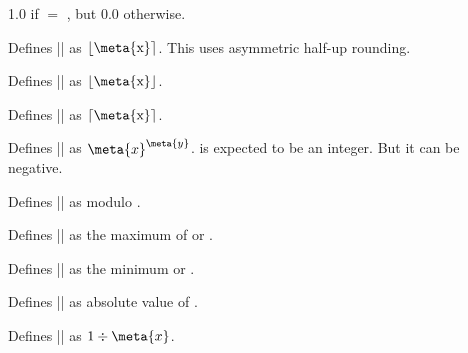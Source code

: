 \begin{command}{\pgfmathequalto{}}       
	1.0 if  $=$ , but 0.0 otherwise.                    
\end{command}

\begin{command}{\pgfmathround{}}              
	Defines |\pgfmathresult| as $\left\lfloor\textrm{\meta{x}}\right\rceil$.	
	This uses asymmetric	half-up rounding.                          
\end{command}

\begin{command}{\pgfmathfloor{}}              
	Defines |\pgfmathresult| as $\left\lfloor\textrm{\meta{x}}\right\rfloor$.
\end{command}

\begin{command}{\pgfmathceil{}}               
	Defines |\pgfmathresult| as $\left\lceil\textrm{\meta{x}}\right\rceil$.                           
\end{command}
	
\begin{command}{\pgfmathpower{}}         
	Defines |\pgfmathresult| as $\meta{x}^{\meta{y}}$.  is 
	expected to be an integer. But it can be negative.
\end{command}

\begin{command}{\pgfmathmod{}}           
	Defines |\pgfmathresult| as  modulo .                       
\end{command}

\begin{command}{\pgfmathmax{}}           
	Defines |\pgfmathresult| as the maximum of  or .                       
\end{command}

\begin{command}{\pgfmathmin{}}           
	Defines |\pgfmathresult| as the minimum  or .                       
\end{command}
	
\begin{command}{\pgfmathabs{}}                
	Defines |\pgfmathresult| as  absolute value of .                                 
\end{command}

\begin{command}{\pgfmathreciprocal{}}         
	Defines |\pgfmathresult| as $1\div\meta{x}$.                                  
\end{command}
	
